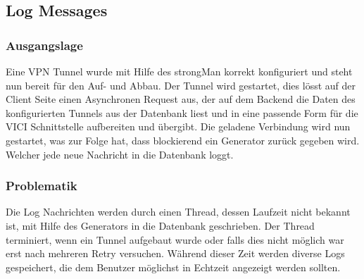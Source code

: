\newpage
\subsection{Log Messages}
\subsubsection{Ausgangslage}
Eine VPN Tunnel wurde mit Hilfe des strongMan korrekt konfiguriert und steht nun bereit für den Auf- und Abbau.
Der Tunnel wird gestartet, dies lösst auf der Client Seite einen Asynchronen Request aus, der auf dem Backend die Daten des konfigurierten Tunnels aus der Datenbank liest und in eine passende Form für die VICI Schnittstelle aufbereiten und übergibt. Die geladene Verbindung wird nun gestartet, was zur Folge hat, dass blockierend ein Generator zurück gegeben wird. Welcher jede neue Nachricht in die Datenbank loggt.

\subsubsection{Problematik}
Die Log Nachrichten werden durch einen Thread, dessen Laufzeit nicht bekannt ist, mit Hilfe des Generators in die Datenbank geschrieben. Der Thread terminiert, wenn ein Tunnel aufgebaut wurde oder falls dies nicht möglich war erst nach mehreren Retry versuchen. Während dieser Zeit werden diverse Logs gespeichert, die dem Benutzer möglichst in Echtzeit angezeigt werden sollten. 

